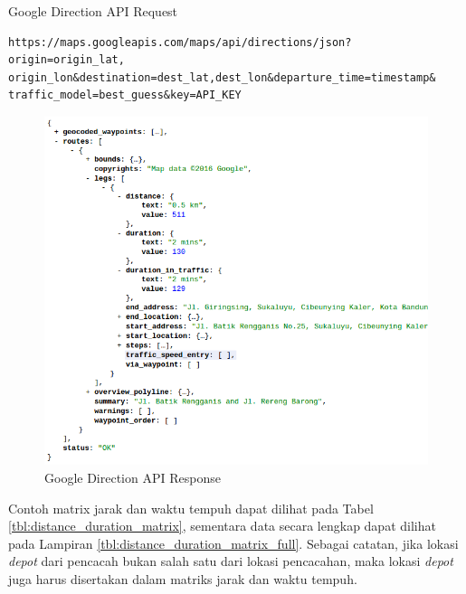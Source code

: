\begin{listing}
	\caption{Google Direction API Request}
	\label{lst:google_direction_api_request}
	\begin{verbatim}
https://maps.googleapis.com/maps/api/directions/json?origin=origin_lat,
origin_lon&destination=dest_lat,dest_lon&departure_time=timestamp&
traffic_model=best_guess&key=API_KEY
	\end{verbatim}
\end{listing}


\begin{figure}[h]
	\centering
	\includegraphics[width=\textwidth]{../../Resources/Images/google_direction_api_response}
	\caption{Google Direction API Response}
	\label{fig:google_direction_api_response}
\end{figure}


Contoh matrix jarak dan waktu tempuh dapat dilihat pada Tabel \ref{tbl:distance_duration_matrix}, sementara data secara lengkap dapat dilihat pada Lampiran \ref{tbl:distance_duration_matrix_full}. Sebagai catatan, jika lokasi \textit{depot} dari pencacah bukan salah satu dari lokasi pencacahan, maka lokasi \textit{depot} juga harus disertakan dalam matriks jarak dan waktu tempuh.


